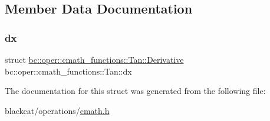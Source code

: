 \subsection{Member Data Documentation}
\mbox{\label{structbc_1_1oper_1_1cmath__functions_1_1Tan_a66fb4e7892aaed9f17a504186b87b7ab}} 
\subsubsection{\texorpdfstring{dx}{dx}}
{\footnotesize\ttfamily struct \hyperlink{structbc_1_1oper_1_1cmath__functions_1_1Tan_1_1Derivative}{bc\+::oper\+::cmath\+\_\+functions\+::\+Tan\+::\+Derivative}   bc\+::oper\+::cmath\+\_\+functions\+::\+Tan\+::dx}



The documentation for this struct was generated from the following file\+:\begin{DoxyCompactItemize}
\item 
blackcat/operations/\hyperlink{cmath_8h}{cmath.\+h}\end{DoxyCompactItemize}
